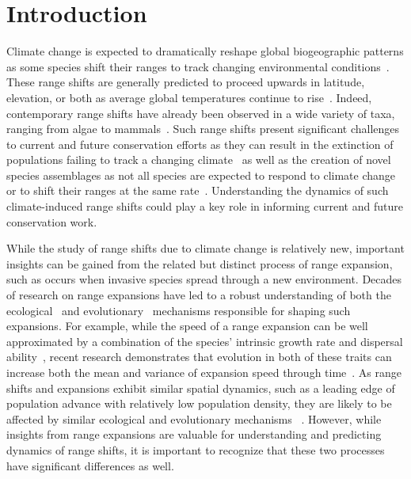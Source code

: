 \documentclass[12pt, oneside]{article}
\begin{document}
\newpage

\section*{Introduction}
Climate change is expected to dramatically reshape global biogeographic patterns as some species shift their ranges to track changing environmental conditions~\citep{gonzalez2010global}. These range shifts are generally predicted to proceed upwards in latitude, elevation, or both as average global temperatures continue to rise~\citep{loarie2009velocity}. Indeed, contemporary range shifts have already been observed in a wide variety of taxa, ranging from algae to mammals~\citep{chen2011rapid, parmesan2006ecological}. Such range shifts present significant challenges to current and future conservation efforts as they can result in the extinction of populations failing to track a changing climate~\citep{parmesan2006ecological} as well as the creation of novel species assemblages as not all species are expected to respond to climate change or to shift their ranges at the same rate~\citep{hobbs2009novel}. Understanding the dynamics of such climate-induced range shifts could play a key role in informing current and future conservation work.

While the study of range shifts due to climate change is relatively new, important insights can be gained from the related but distinct process of range expansion, such as occurs when invasive species spread through a new environment. Decades of research on range expansions have led to a robust understanding of both the ecological~\citep{hastings2005spatial} and evolutionary~\citep{shine2011evolutionary, excoffier2009genetic} mechanisms responsible for shaping such expansions. For example, while the speed of a range expansion can be well approximated by a combination of the species' intrinsic growth rate and dispersal ability~\citep{hastings2005spatial}, recent research demonstrates that evolution in both of these traits can increase both the mean and variance of expansion speed through time~\citep{weiss2017rapid, ochocki2017rapid, szHucs2017rapid, shaw2015dispersal}. As range shifts and expansions exhibit similar spatial dynamics, such as a leading edge of population advance with relatively low population density, they are likely to be affected by similar ecological and evolutionary mechanisms ~\citep{hargreaves2014evolution}. However, while insights from range expansions are valuable for understanding and predicting dynamics of range shifts, it is important to recognize that these two processes have significant differences as well.
\end{document}

